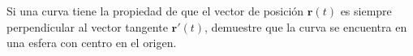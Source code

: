 \item Si una curva tiene la propiedad de que el vector de posición $\mathbf{r}(t)$ es siempre perpendicular al vector tangente $\mathbf{r}'(t)$, demuestre que la curva se encuentra en una esfera con centro en el origen.
